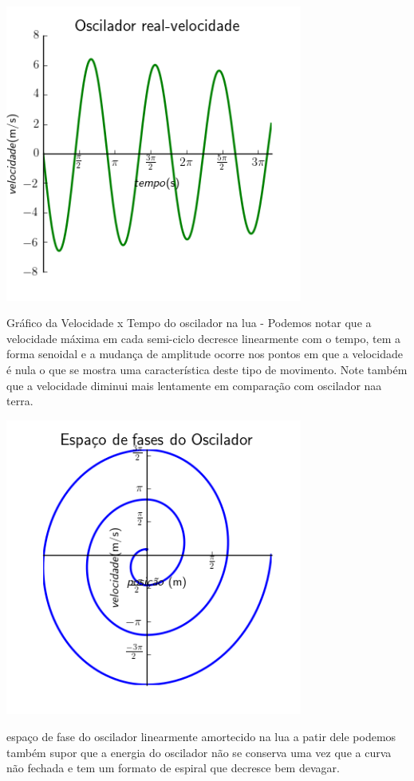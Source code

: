 \documentclass[a4paper]{article} %
\begin{document}
\begin{center}
	
	\includegraphics[width=3.84in,height=3.84in,keepaspectratio = false]{image2_2.png}
	
	\scriptsize Gr\'afico da Velocidade x Tempo do oscilador na lua - Podemos notar que a velocidade m\'axima em cada semi-ciclo decresce linearmente com o tempo, tem a forma senoidal e a mudan\c{c}a de amplitude ocorre nos pontos em que a velocidade \'e nula o que se mostra uma caracter\'istica deste tipo de movimento. Note tamb\'em que a velocidade diminui mais lentamente em compara\c{c}\~ao com oscilador naa terra.  
\end{center}

\begin{center}
	
	\includegraphics[width=3.84in,height=3.84in,keepaspectratio = false]{image1_3.png}
	
	\scriptsize espa\c{c}o de fase do oscilador linearmente amortecido na lua a patir dele podemos tamb\'em supor que a energia do oscilador n\~ao se conserva uma vez que a curva n\~ao fechada e tem um formato de espiral que decresce bem devagar.
\end{center}
 
\end{document}
